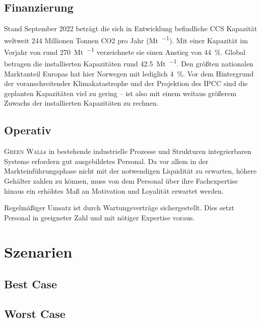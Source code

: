         \subsection{Finanzierung}

            Stand September 2022 beträgt die sich in Entwicklung befindliche CCS Kapazität weltweit \num{244} Millionen Tonnen CO2 pro Jahr (\unit{\mega\tonne\per\an}).
            Mit einer Kapazität im Vorjahr von rund \qty{270}{\mega\tonne\per\an} verzeichnete sie einen Anstieg von \qty{44}{\percent}.
            Global betragen die installierten Kapazitäten rund \qty{42.5}{\mega\tonne\per\an}.
            Den größten nationalen Marktanteil Europas hat hier Norwegen mit lediglich \qty{4}{\percent}.
            Vor dem Hintergrund der voranschreitender Klimakatastrophe und der Projektion des IPCC sind die geplanten Kapazitäten viel zu gering -- ist also mit einem weitaus größerem Zuwachs der installierten Kapazitäten zu rechnen\cite{Book.EJR.CARBONCAPTUREUTILISATIONANDSTORAGEINTHEEUROPEANUNION.2023}.\par\medskip


        \subsection{Operativ}

            \textsc{Green Wall}s in bestehende industrielle Prozesse und Strukturen integrierbaren Systeme erfordern gut ausgebildetes Personal.
            Da vor allem in der Markteinführungsphase nicht mit der notwendigen Liquidität zu erwarten, höhere Gehälter zahlen zu können, muss von dem Personal über ihre Fachexpertise hinaus ein erhöhtes Maß an Motivation und Loyalität erwartet werden.\par\medskip

            Regelmäßiger Umsatz ist durch Wartungsverträge sichergestellt.
            Dies setzt Personal in geeigneter Zahl und mit nötiger Expertise voraus.
    
    \section{Szenarien}

        \subsection{Best Case}

        \subsection{Worst Case}

